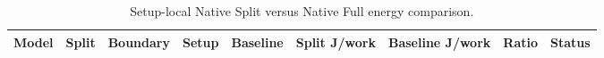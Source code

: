 \begin{table}[t]
\centering
\small
\caption{Setup-local Native Split versus Native Full energy comparison.}
\label{tab:native-energy-pair-comparison}
\begin{tabular}{lrrrrrrrr}
\toprule
Model & Split & Boundary & Setup & Baseline & Split J/work & Baseline J/work & Ratio & Status \\
\midrule
\bottomrule
\end{tabular}
\end{table}
